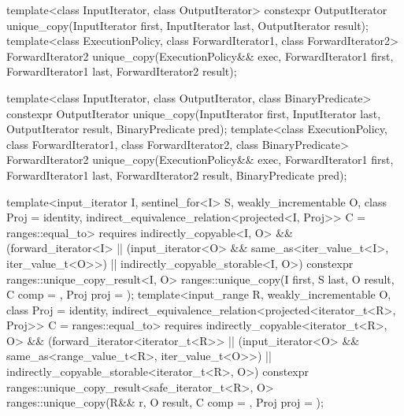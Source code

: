 %
\begin{itemdecl}
template<class InputIterator, class OutputIterator>
  constexpr OutputIterator
    unique_copy(InputIterator first, InputIterator last,
                OutputIterator result);
template<class ExecutionPolicy, class ForwardIterator1, class ForwardIterator2>
  ForwardIterator2
    unique_copy(ExecutionPolicy&& exec,
                ForwardIterator1 first, ForwardIterator1 last,
                ForwardIterator2 result);

template<class InputIterator, class OutputIterator,
         class BinaryPredicate>
  constexpr OutputIterator
    unique_copy(InputIterator first, InputIterator last,
                OutputIterator result, BinaryPredicate pred);
template<class ExecutionPolicy, class ForwardIterator1, class ForwardIterator2,
         class BinaryPredicate>
  ForwardIterator2
    unique_copy(ExecutionPolicy&& exec,
                ForwardIterator1 first, ForwardIterator1 last,
                ForwardIterator2 result, BinaryPredicate pred);

template<input_iterator I, sentinel_for<I> S, weakly_incrementable O, class Proj = identity,
         indirect_equivalence_relation<projected<I, Proj>> C = ranges::equal_to>
  requires indirectly_copyable<I, O> &&
           (forward_iterator<I> ||
            (input_iterator<O> && same_as<iter_value_t<I>, iter_value_t<O>>) ||
            indirectly_copyable_storable<I, O>)
  constexpr ranges::unique_copy_result<I, O>
    ranges::unique_copy(I first, S last, O result, C comp = {}, Proj proj = {});
template<input_range R, weakly_incrementable O, class Proj = identity,
         indirect_equivalence_relation<projected<iterator_t<R>, Proj>> C = ranges::equal_to>
  requires indirectly_copyable<iterator_t<R>, O> &&
           (forward_iterator<iterator_t<R>> ||
            (input_iterator<O> && same_as<range_value_t<R>, iter_value_t<O>>) ||
            indirectly_copyable_storable<iterator_t<R>, O>)
  constexpr ranges::unique_copy_result<safe_iterator_t<R>, O>
    ranges::unique_copy(R&& r, O result, C comp = {}, Proj proj = {});
\end{itemdecl}

